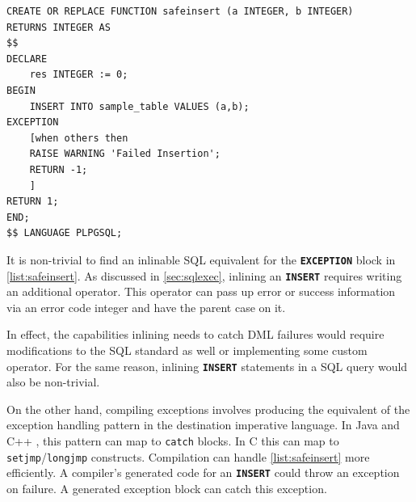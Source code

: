 \documentclass[12pt]{cmuthesis}
\newcommand{\dbSQL}[1]{\texttt{\textbf{#1}}\xspace}
\begin{document}
\begin{listing}
    \begin{verbatim}
CREATE OR REPLACE FUNCTION safeinsert (a INTEGER, b INTEGER) 
RETURNS INTEGER AS 
$$
DECLARE
    res INTEGER := 0;
BEGIN
    INSERT INTO sample_table VALUES (a,b);
EXCEPTION
    [when others then 
    RAISE WARNING 'Failed Insertion';
    RETURN -1;
    ]
RETURN 1;
END;
$$ LANGUAGE PLPGSQL;
    \end{verbatim}
    \caption{Example of a function that handles a failure to \dbSQL{INSERT} into \dbSQL{sample\_table}. It returns -1 on failure and 1 on success.}
        \label{list:safeinsert}
        \end{listing}

It is non-trivial to find an inlinable SQL equivalent for the \dbSQL{EXCEPTION} block in \cref{list:safeinsert}. As discussed in \cref{sec:sqlexec}, inlining an \dbSQL{INSERT} requires writing an additional operator. This operator can pass up error or success information via an error code integer and have the parent case on it.


In effect, the capabilities inlining needs to catch DML failures would require modifications to the SQL standard as well or implementing some custom operator. For the same reason, inlining \dbSQL{INSERT} statements in a SQL query would also be non-trivial. 

On the other hand, compiling exceptions involves producing the equivalent of the exception handling pattern in the destination imperative language. In Java and C++ , this pattern can map to \texttt{catch} blocks. In C this can map to \texttt{setjmp}/\texttt{longjmp} constructs. Compilation can handle \cref{list:safeinsert} more efficiently. A compiler's generated code for an \dbSQL{INSERT} could throw an exception on failure. A generated exception block can catch this exception.\\
\end{document}
